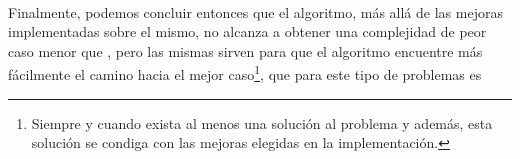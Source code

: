 \paragraph{}
Finalmente, podemos concluir entonces que el algoritmo, más allá de las mejoras implementadas sobre el mismo, no alcanza a obtener una complejidad de peor caso menor que , pero las mismas sirven para que el algoritmo encuentre más fácilmente el camino hacia el mejor caso\footnote{Siempre y cuando exista al menos una solución al problema y además, esta solución se condiga con las mejoras elegidas en la implementación.}, que para este tipo de problemas es 